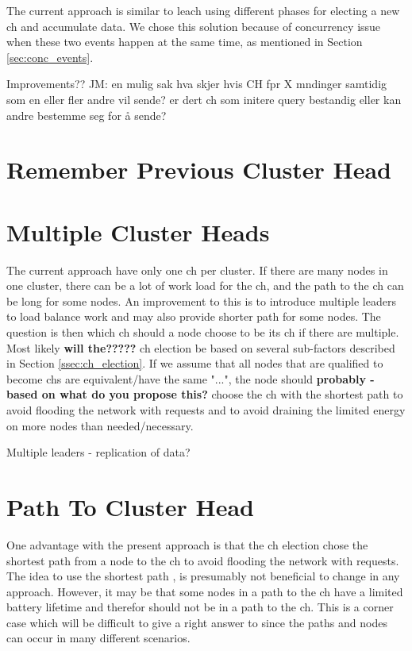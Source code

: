 \documentclass[USenglish]{uit-thesis}
\begin{document}
The current approach is similar to \gls{leach} using different phases for electing a new \gls{ch} and accumulate data. We chose this solution because of concurrency issue when these two events happen at the same time, as mentioned in Section \ref{sec:conc_events}. 

Improvements??
JM: en mulig sak hva skjer hvis CH fpr X mndinger samtidig som en eller fler andre vil sende? er dert ch som initere query bestandig eller kan andre bestemme seg for å sende?


\section{Remember Previous Cluster Head}



\section{Multiple Cluster Heads}
The current approach have only one \gls{ch} per cluster. If there are many nodes in one cluster, there can be a lot of work load for the \gls{ch}, and the path to the \gls{ch} can be long for some nodes.
An improvement to this is to introduce multiple leaders to load balance work and may also provide shorter path for some nodes. The question is then which \gls{ch} should a node choose to be its \gls{ch} if there are multiple. Most likely \textbf{will the?????} \gls{ch} election be based on several sub-factors described in Section \ref{ssec:ch_election}. If we assume that all nodes that are qualified to become \gls{ch}s are equivalent/have the same "...", the node should \textbf{probably - based on what do you propose this?} choose the \gls{ch} with the shortest path to avoid flooding the network with requests and to avoid draining the limited energy on more nodes than needed/necessary.

Multiple leaders - replication of data?

\section{Path To Cluster Head}
One advantage with the present approach is that the \gls{ch} election chose the shortest path from a node to the \gls{ch} to avoid flooding the network with requests. The idea to use the shortest path \cite{dijkstra}, is presumably not beneficial to change in any approach. However, it may be that some nodes in a path to the \gls{ch} have a limited battery lifetime and therefor should not be in a path to the \gls{ch}. This is a corner case which will be difficult to give a right answer to since the paths and nodes can occur in many different scenarios.
\end{document}

